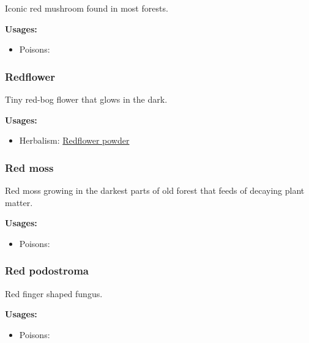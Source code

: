 Iconic red mushroom found in most forests.

\vspace{5mm}

\textbf{Usages:}

\begin{itemize}[noitemsep]
\item[] Poisons: \poison
\end{itemize}

\subsubsection{Redflower}
\label{Redflower}

Tiny red-bog flower that glows in the dark.

\vspace{5mm}

\textbf{Usages:}

\begin{itemize}[noitemsep]
\item[] Herbalism: \hyperref[Redflower powder]{Redflower powder}
\end{itemize}

\subsubsection{Red moss}
\label{Red moss}

Red moss growing in the darkest parts of old forest that feeds of decaying plant matter.

\vspace{5mm}

\textbf{Usages:}

\begin{itemize}[noitemsep]
\item[] Poisons: \poison
\end{itemize}

\subsubsection{Red podostroma}
\label{Red podostroma}

Red finger shaped fungus.

\vspace{5mm}

\textbf{Usages:}

\begin{itemize}[noitemsep]
\item[] Poisons: \poison
\end{itemize}

